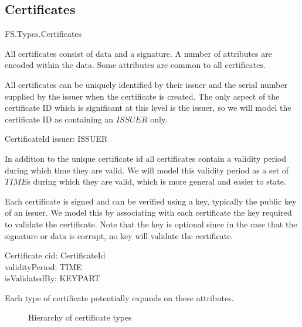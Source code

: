 \subsection{Certificates}

\begin{traceunit}{FS.Types.Certificates}
\end{traceunit}

All certificates consist of data and a signature. A number of
attributes are encoded within the data. Some attributes are common to
all certificates. 

All certificates can be uniquely identified by their issuer and the
serial number supplied by the issuer when the certificate is created.
The only aspect of the certificate ID which is significant at this 
level is the issuer, so we will model the certificate ID as containing
an $ISSUER$ only.
\begin{schema}{CertificateId}
	issuer: ISSUER
\end{schema}

In addition to the unique certificate id all certificates contain a
validity period during which time they are valid. We will model this
validity period as a set of $TIME$s during which they are valid,
which is more general and easier to state. 

Each certificate is signed and can be verified using a key, typically the
public key of an issuer. We model this by associating with each
certificate the key required to validate the certificate. Note that
the key is optional since in the case that the signature or data is
corrupt, no key will validate the certificate.

\begin{schema}{Certificate}
        cid: CertificateId
\\	validityPeriod: \power TIME
\\      isValidatedBy: \Optional KEYPART
\end{schema}

Each type of certificate potentially expands on these attributes.

\begin{figure}[htbp]
  \begin{center}
    \leavevmode
    \caption{Hierarchy of certificate types}
    \label{fig:certificates}
  \end{center}
\end{figure}


